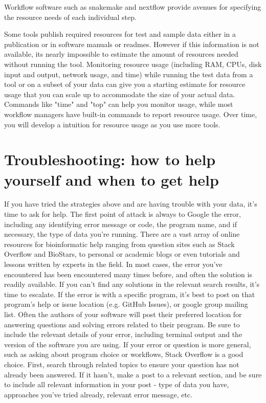 \documentclass[10pt,letterpaper]{article}
\begin{document}
Workflow software such as snakemake and nextflow provide avenues for specifying the resource needs of each individual step.

Some tools publish required resources for test and sample data either in a publication or in software manuals or readmes. However if this information is not available, its nearly impossible to estimate the amount of resources needed without running the tool. Monitoring resource usage (including RAM, CPUs, disk input and output, network usage, and time) while running the test data from a tool or on a subset of your data can give you a starting estimate for resource usage that you can scale up to accommodate the size of your actual data. Commands like "time" and "top" can help you monitor usage, while most workflow managers have built-in commands to report resource usage. Over time, you will develop a intuition for resource usage as you use more tools.


\section*{Troubleshooting: how to help yourself and when to get help}

If you have tried the strategies above and are having trouble with your data, it’s time to ask for help. The first point of attack is always to Google the error, including any identifying error message or code, the program name, and if necessary, the type of data you’re running. There are a vast array of online resources for bioinformatic help ranging from question sites such as Stack Overflow and BioStars, to personal or academic blogs or even tutorials and lessons written by experts in the field. In most cases, the error you’ve encountered has been encountered many times before, and often the solution is readily available. If you can’t find any solutions in the relevant search results, it’s time to escalate. If the error is with a specific program, it’s best to post on that program’s help or issue location (e.g. GitHub Issues), or google group mailing list. Often the authors of your software will post their preferred location for answering questions and solving errors related to their program. Be sure to include the relevant details of your error, including terminal output and the version of the software you are using. If your error or question is more general, such as asking about program choice or workflows, Stack Overflow is a good choice. First, search through related topics to ensure your question has not already been answered. If it hasn’t, make a post to a relevant section, and be sure to include all relevant information in your post - type of data you have, approaches you’ve tried already, relevant error message, etc. 
\end{document}
